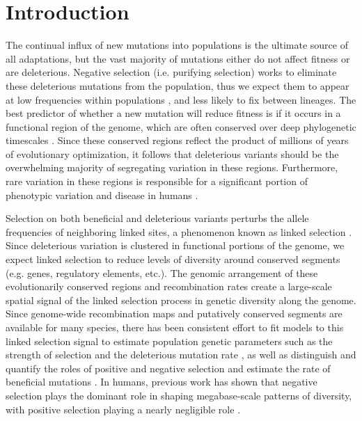 \documentclass[11pt]{article}
\begin{document}
\section*{Introduction}

The continual influx of new mutations into populations is the ultimate source
of all adaptations, but the vast majority of mutations either do not affect
fitness or are deleterious. Negative selection (i.e. purifying selection) works
to eliminate these deleterious mutations from the population, thus we expect
them to appear at low frequencies within populations
\parencite{Haldane1927-ga}, and less likely to fix between lineages. The best
predictor of whether a new mutation will reduce fitness is if it occurs in a
functional region of the genome, which are often conserved over deep
phylogenetic timescales \parencite{Siepel2005-wh,Margulies2003-sn}. Since these
conserved regions reflect the product of millions of years of evolutionary
optimization, it follows that deleterious variants should be the overwhelming
majority of segregating variation in these regions. Furthermore, rare variation
in these regions is responsible for a significant portion of phenotypic
variation and disease in humans
\parencite{Zeng2018-ci,Lek2016-cb,Karczewski2020-ky,Tennessen2012-ge}.

Selection on both beneficial and deleterious variants perturbs the allele
frequencies of neighboring linked sites, a phenomenon known as linked selection
\parencite{Nordborg1996-nq,Maynard_Smith1974-zr,Barton1998-aj,Charlesworth1993-gb}.
Since deleterious variation is clustered in functional portions of the genome,
we expect linked selection to reduce levels of diversity around conserved
segments (e.g. genes, regulatory elements, etc.). The genomic arrangement of
these evolutionarily conserved regions and recombination rates create a
large-scale spatial signal of the linked selection process in genetic diversity
along the genome. Since genome-wide recombination maps and putatively conserved
segments are available for many species, there has been consistent effort to
fit models to this linked selection signal to estimate population genetic
parameters such as the strength of selection and the deleterious mutation rate
\parencite{Hudson1995-pt,McVicker2009-ax}, as well as distinguish and quantify
the roles of positive and negative selection and estimate the rate of
beneficial mutations \parencite{Elyashiv2016-vt,Murphy2022-sj}. In humans,
previous work has shown that negative selection plays the dominant role in
shaping megabase-scale patterns of diversity, with positive selection playing a
nearly negligible role \parencite{Murphy2022-sj}.
\end{document}
